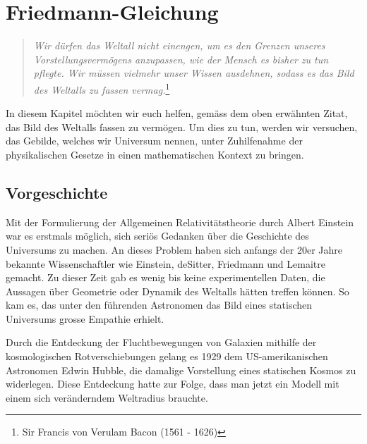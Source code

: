 \chapter{Friedmann-Gleichung\label{chapter:thema}}
\begin{refsection}
\printbibliography[heading=subbibliography]
\rhead{}
\begin{quote}
	\textit{Wir dürfen das Weltall nicht einengen, um es den Grenzen unseres Vorstellungsvermögens anzupassen, wie der Mensch es bisher zu tun pflegte. Wir müssen vielmehr unser Wissen ausdehnen, sodass es das Bild des Weltalls zu fassen vermag.}\footnote{Sir Francis von Verulam Bacon (1561 - 1626)}
\end{quote}
In diesem Kapitel möchten wir euch helfen, gemäss dem oben erwähnten Zitat, das Bild des Weltalls fassen zu vermögen. Um dies zu tun, werden wir versuchen, das Gebilde, welches wir Universum nennen, unter Zuhilfenahme der physikalischen Gesetze in einen mathematischen Kontext zu bringen.

\section{Vorgeschichte}
Mit der Formulierung der Allgemeinen Relativitätstheorie durch Albert Einstein war es erstmals möglich,
sich seriös Gedanken über die Geschichte des
Universums zu machen. An dieses Problem haben sich anfangs der 20er Jahre bekannte Wissenschaftler wie Einstein, deSitter, Friedmann und Lemaitre gemacht. 
Zu dieser Zeit gab es wenig bis keine experimentellen Daten, die Aussagen über Geometrie oder Dynamik des Weltalls hätten treffen können. So kam es, das unter den führenden Astronomen das Bild eines statischen Universums grosse Empathie erhielt.

Durch die Entdeckung der Fluchtbewegungen von Galaxien mithilfe der kosmologischen Rotverschiebungen gelang es 1929 dem US-amerikanischen Astronomen Edwin Hubble, die damalige Vorstellung eines statischen Kosmos zu widerlegen. Diese Entdeckung hatte zur Folge, dass man jetzt ein Modell mit einem sich veränderndem Weltradius brauchte.
\pagebreak

\end{refsection}

